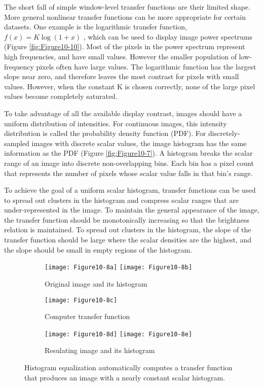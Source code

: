 The short fall of simple window-level transfer functions are their limited shape. More general nonlinear transfer functions can be more appropriate for certain datasets. One example is the logarithmic transfer function, $f(x) = K \log ( 1 + x )$ , which can be used to display image power spectrums (Figure \ref{fig:Figure10-10}). Most of the pixels in the power spectrum represent high frequencies, and have small values. However the smaller population of low-frequency pixels often have large values. The logarithmic function has the largest slope near zero, and therefore leaves the most contrast for pixels with small values. However, when the constant K is chosen correctly, none of the large pixel values become completely saturated.

To take advantage of all the available display contrast, images should have a uniform distribution of intensities. For continuous images, this intensity distribution is called the probability density function (PDF). For discretely-sampled images with discrete scalar values, the image histogram has the same information as the PDF (Figure \ref{fig:Figure10-7}). A histogram breaks the scalar range of an image into discrete non-overlapping bins. Each bin has a pixel count that represents the number of pixels whose scalar value falls in that bin's range.

To achieve the goal of a uniform scalar histogram, transfer functions can be used to spread out clusters in the histogram and compress scalar ranges that are under-represented in the image. To maintain the general appearance of the image, the transfer function should be monotonically increasing so that the brightness relation is maintained. To spread out clusters in the histogram, the slope of the transfer function should be large where the scalar densities are the highest, and the slope should be small in empty regions of the histogram.

\begin{figure}[htb]
	\begin{subfigure}[h]{0.96\linewidth}
		\texttt{[image: Figure10-8a]}
		\texttt{[image: Figure10-8b]}
		\captionsetup{justification=centering}
		\caption*{Original image and its histogram}
		\label{fig:Figure10-8a}
	\end{subfigure}
	\hfill

	\begin{subfigure}[h]{0.48\linewidth}
		\texttt{[image: Figure10-8c]}
		\captionsetup{justification=centering}
		\caption*{Computer transfer function}
		\label{fig:Figure10-8c}
	\end{subfigure}

	\hfill
	\begin{subfigure}[h]{0.96\linewidth}
		\texttt{[image: Figure10-8d]}
		\texttt{[image: Figure10-8e]}
		\captionsetup{justification=centering}
		\caption*{Resulating image and its histogram}
		\label{fig:Figure10-8d}
	\end{subfigure}
	\caption{Histogram equalization automatically computes a transfer function that produces an image with a nearly constant scalar histogram.}\label{fig:Figure10-8}
\end{figure}


